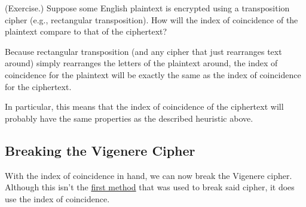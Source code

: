 \documentclass[letterpaper]{article}
\begin{document}
\begin{mdframed}
    (Exercise.) Suppose some English plaintext is encrypted using a transposition cipher (e.g., rectangular transposition). How will the index of coincidence of the plaintext compare to that of the ciphertext?

    \begin{mdframed}
        Because rectangular transposition (and any cipher that just rearranges text around) simply rearranges the letters of the plaintext around, the index of coincidence for the plaintext will be exactly the same as the index of coincidence for the ciphertext.

        \bigskip 

        In particular, this means that the index of coincidence of the ciphertext will probably have the same properties as the described heuristic above.
    \end{mdframed}
\end{mdframed}


\subsection{Breaking the Vigenere Cipher}
With the index of coincidence in hand, we can now break the Vigenere cipher. Although this isn't the \href{https://en.wikipedia.org/wiki/Kasiski_examination}{first method} that was used to break said cipher, it does use the index of coincidence.

\bigskip 
\end{document}
